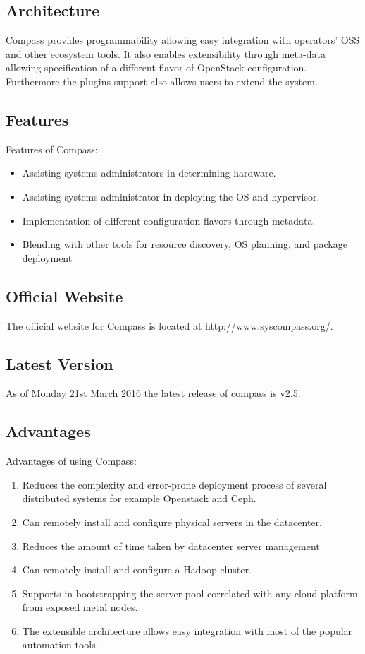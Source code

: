 \documentclass[a4paper, 12pt]{article}
\begin{document}
\subsection{Architecture}
Compass provides programmability allowing easy integration with operators’ OSS and other ecosystem tools. It also enables extensibility through meta-data allowing specification of a different flavor of OpenStack configuration. Furthermore the plugins support also allows users to extend the system.

\subsection{Features}
Features of Compass:
\begin{itemize}
\item
Assisting systems administrators in determining hardware.
\item
Assisting systems administrator in deploying the OS and hypervisor.
\item
Implementation of different configuration flavors through metadata.
\item
Blending with other tools for resource discovery, OS planning, and package deployment
\end{itemize}

\subsection{Official Website}
The official website for Compass is located at \href{http://www.syscompass.org/}{http://www.syscompass.org/}.

\subsection{Latest Version}
As of Monday 21st March 2016 the latest release of compass is v2.5.

\subsection{Advantages}
Advantages of using Compass:
\begin{enumerate}
\item
Reduces the complexity and error-prone deployment process of several distributed systems for example Openstack and Ceph.
\item
Can remotely install and configure physical servers in the datacenter.
\item
Reduces the amount of time taken by datacenter server management 
\item
Can remotely install and configure a Hadoop cluster.
\item
Supports in bootstrapping the server pool correlated with any cloud platform from exposed metal nodes.
\item
The extensible architecture allows easy integration with most of the popular automation tools.
\end{enumerate}
\end{document}
